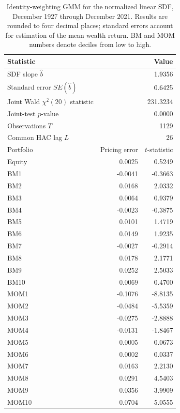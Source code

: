 \begin{table}[!htbp]
  \centering
  \small
  \caption{Identity-weighting GMM for the normalized linear SDF,
  December 1927 through December 2021.
  Results are rounded to four decimal places; standard errors account for
  estimation of the mean wealth return. BM and MOM numbers denote deciles from low to high.}
  \label{tab:q4b-gmm-results}
  \begin{tabular}{lrr}
    \toprule
    Statistic & \multicolumn{2}{r}{Value} \\
    \midrule
    SDF slope $\hat b$ & \multicolumn{2}{r}{1.9356} \\
    Standard error $SE(\hat b)$ & \multicolumn{2}{r}{0.6425} \\
    Joint Wald $\chi^2(20)$ statistic & \multicolumn{2}{r}{231.3234} \\
    Joint-test $p$-value & \multicolumn{2}{r}{0.0000} \\
    Observations $T$ & \multicolumn{2}{r}{1129} \\
    Common HAC lag $L$ & \multicolumn{2}{r}{26} \\
    \midrule
    Portfolio & Pricing error & $t$-statistic \\
    \midrule
    Equity & 0.0025 & 0.5249 \\
    \addlinespace
    BM1 & -0.0041 & -0.3663 \\
    BM2 & 0.0168 & 2.0332 \\
    BM3 & 0.0064 & 0.9379 \\
    BM4 & -0.0023 & -0.3875 \\
    BM5 & 0.0101 & 1.4719 \\
    BM6 & 0.0149 & 1.9235 \\
    BM7 & -0.0027 & -0.2914 \\
    BM8 & 0.0178 & 2.1771 \\
    BM9 & 0.0252 & 2.5033 \\
    BM10 & 0.0069 & 0.4700 \\
    \addlinespace
    MOM1 & -0.1076 & -8.8135 \\
    MOM2 & -0.0484 & -5.5359 \\
    MOM3 & -0.0275 & -2.8888 \\
    MOM4 & -0.0131 & -1.8467 \\
    MOM5 & 0.0005 & 0.0673 \\
    MOM6 & 0.0002 & 0.0337 \\
    MOM7 & 0.0163 & 2.2130 \\
    MOM8 & 0.0291 & 4.5403 \\
    MOM9 & 0.0356 & 3.9909 \\
    MOM10 & 0.0704 & 5.0555 \\
    \bottomrule
  \end{tabular}
\end{table}
